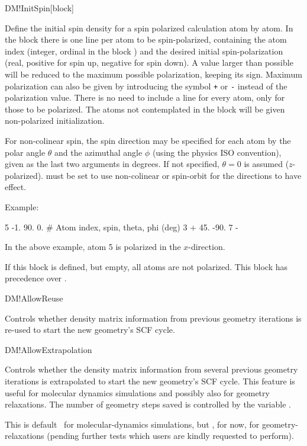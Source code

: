 \begin{fdfentry}{DM!InitSpin}[block]
  
  Define the initial spin density for a spin polarized calculation
  atom by atom. In the block there is one line per atom to be
  spin-polarized, containing the atom index (integer, ordinal in the
  block ) and the desired
  initial spin-polarization (real, positive for spin up, negative for
  spin down). A value larger than possible will be reduced to the
  maximum possible polarization, keeping its sign. Maximum
  polarization can also be given by introducing the symbol \texttt{+}
  or \texttt{-} instead of the polarization value. There is no need
  to include a line for every atom, only for those to be
  polarized. The atoms not contemplated in the block will be given
  non-polarized initialization. 

  For non-colinear spin, the spin direction may be specified for each
  atom by the polar angle $\theta$ and the azimuthal angle $\phi$
  (using the physics ISO convention), given as the last two arguments
  in degrees. If not specified, $\theta=0$ is assumed
  ($z$-polarized).  must be set to use non-colinear or
  spin-orbit for the directions to have effect.

  Example:
  \begin{fdfexample}
        5  -1.   90.   0.   # Atom index, spin, theta, phi (deg)
        3   +    45. -90.
        7   -
  \end{fdfexample}
  In the above example, atom 5 is polarized in the $x$-direction.

  If this block is defined, but empty, all atoms are not polarized.
  This block has precedence over .

\end{fdfentry}

\begin{fdflogicalT}{DM!AllowReuse}

  Controls whether density matrix information from previous geometry
  iterations is re-used to start the new geometry's SCF cycle.
  
\end{fdflogicalT}

\begin{fdflogicalT}{DM!AllowExtrapolation}

  Controls whether the density matrix information from several
  previous geometry iterations is extrapolated to start the new
  geometry's SCF cycle.  This feature is useful for molecular dynamics
  simulations and possibly also for geometry relaxations.  The number
  of geometry steps saved is controlled by the variable
  .

  This is default \fdftrue\ for molecular-dynamics simulations, but
  \fdffalse, for now, for geometry-relaxations (pending further tests
  which users are kindly requested to perform).

\end{fdflogicalT}


